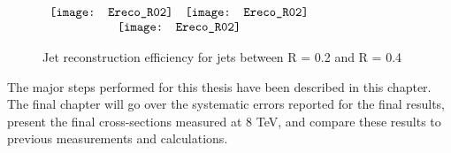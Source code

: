 \begin{figure*}[t!]
$\begin{array}{rl}
    \texttt{[image: Ereco\_R02]} &
    \texttt{[image: Ereco\_R02]}\\
    \multicolumn{2}{c}{\texttt{[image: Ereco\_R02]}}
\end{array}$
\caption[Jet reconstruction efficiency for jets between R = 0.2 and R = 0.4.]{\label{fig:JetRecoeff}Jet reconstruction efficiency for jets between R = 0.2 and R = 0.4}
\end{figure*}


The major steps performed for this thesis have been described in this chapter.  The final chapter will go over the systematic errors reported for the final results, present the final cross-sections measured at 8 TeV, and compare these results to previous measurements and  calculations.

